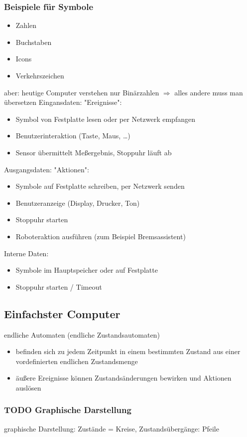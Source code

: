 \documentclass[a4paper]{scrartcl}
\begin{document}
\subsubsection{Beispiele für Symbole}
\label{sec-3-2-1}
\begin{itemize}
\item Zahlen
\item Buchstaben
\item Icons
\item Verkehrszeichen
\end{itemize}
aber: heutige Computer verstehen nur Binärzahlen $\Rightarrow$ alles andere muss man übersetzen
Eingansdaten: "Ereignisse":
\begin{itemize}
\item Symbol von Festplatte lesen oder per Netzwerk empfangen
\item Benutzerinteraktion (Taste, Maus, \ldots{})
\item Sensor übermittelt Meßergebnis, Stoppuhr läuft ab
\end{itemize}
Ausgangsdaten: "Aktionen":
\begin{itemize}
\item Symbole auf Festplatte schreiben, per Netzwerk senden
\item Benutzeranzeige (Display, Drucker, Ton)
\item Stoppuhr starten
\item Roboteraktion ausführen (zum Beispiel Bremsassistent)
\end{itemize}
Interne Daten:
\begin{itemize}
\item Symbole im Hauptspeicher oder auf Festplatte
\item Stoppuhr starten / Timeout
\end{itemize}
\subsection{Einfachster Computer}
\label{sec-3-3}
endliche Automaten (endliche Zustandsautomaten)
\begin{itemize}
\item befinden sich zu jedem Zeitpunkt in einem bestimmten Zustand aus einer vordefinierten endlichen Zustandsmenge
\item äußere Ereignisse können Zustandsänderungen bewirken und Aktionen auslösen
\end{itemize}
\subsubsection{{\bfseries\sffamily TODO} Graphische Darstellung}
\label{sec-3-3-1}
graphische Darstellung: Zustände = Kreise, Zustandsübergänge: Pfeile
\end{document}
